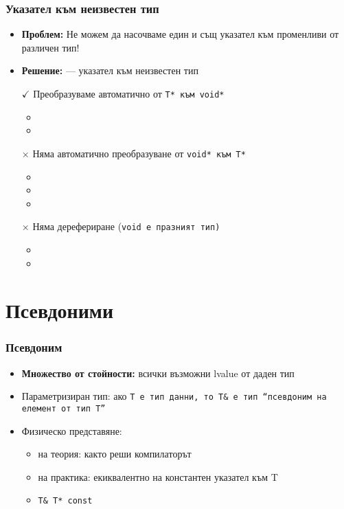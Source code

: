 \documentclass{beamer}
\begin{document}
\begin{frame}
  \frametitle{Указател към неизвестен тип}

  \begin{itemize}[<+->]
  \item \textbf{Проблем:} Не можем да насочваме един и същ указател към променливи от различен тип!
  \item \textbf{Решение:}  --- указател към неизвестен тип
  \item[$\checkmark$] Преобразуваме автоматично от \tt{T*} към \tt{void*}
    \begin{itemize}
    \item {}
    \item {}
    \end{itemize}
  \item[$\times$] \alert{Няма} автоматично преобразуване от \tt{void*} към \tt{T*}
    \begin{itemize}
    \item {}
    \item {}
    \item {}
    \end{itemize}
  \item[$\times$] \alert{Няма} дерефериране (\tt{void} е празният тип)
    \begin{itemize}
    \item {}
    \item {}
    \end{itemize}
  \end{itemize}
\end{frame}

\section{Псевдоними}

\begin{frame}
  \frametitle{Псевдоним}

  \begin{itemize}[<+->]
  \item \textbf{Множество от стойности:} всички възможни lvalue от даден тип
  \item Параметризиран тип: ако \tt T е тип данни, то \tt{T\&} е тип ``псевдоним на елемент от тип \tt T''
  \item Физическо представяне:
    \begin{itemize}
    \item на теория: както реши компилаторът
    \item на практика: екиквалентно на \alert{константен указател към T}
    \item \tt{T\& \eqv T* const}
    \end{itemize}
  \end{itemize}
\end{frame}
\end{document}
